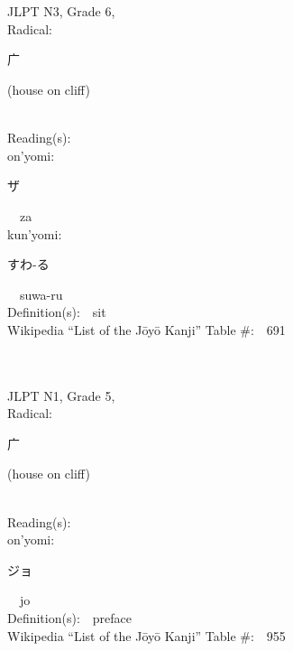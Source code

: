 \begin{multicols}{2}
\ \ \\
{\fontsize{34pt}{40pt}  }\ \ \\  %
{JLPT N3, Grade 6, \\Radical:\ \ {\begin{CJK}{UTF8}{min} 广 \end{CJK}} (house on cliff) } \\
Reading(s):\ \ \\
{\hspace*{1em}}on'yomi:\ \ \\
{\hspace*{2em}}{\begin{CJK}{UTF8}{min} ザ \end{CJK}}\ \ za\ \ \\
{\hspace*{1em}}kun'yomi:\ \ \\
{\hspace*{2em}}{\begin{CJK}{UTF8}{min} すわ-る \end{CJK}}\ \ suwa-ru\ \ \\
Definition(s):\ \ sit \\
Wikipedia ``List of the J\=oy\=o Kanji'' Table \#:\ \ 691 \\
\ \ \\
{\fontsize{34pt}{40pt}  }\ \ \\  %
{JLPT N1, Grade 5, \\Radical:\ \ {\begin{CJK}{UTF8}{min} 广 \end{CJK}} (house on cliff) } \\
Reading(s):\ \ \\
{\hspace*{1em}}on'yomi:\ \ \\
{\hspace*{2em}}{\begin{CJK}{UTF8}{min} ジョ \end{CJK}}\ \ jo\ \ \\
Definition(s):\ \ preface \\
Wikipedia ``List of the J\=oy\=o Kanji'' Table \#:\ \ 955 \\

\end{multicols}
